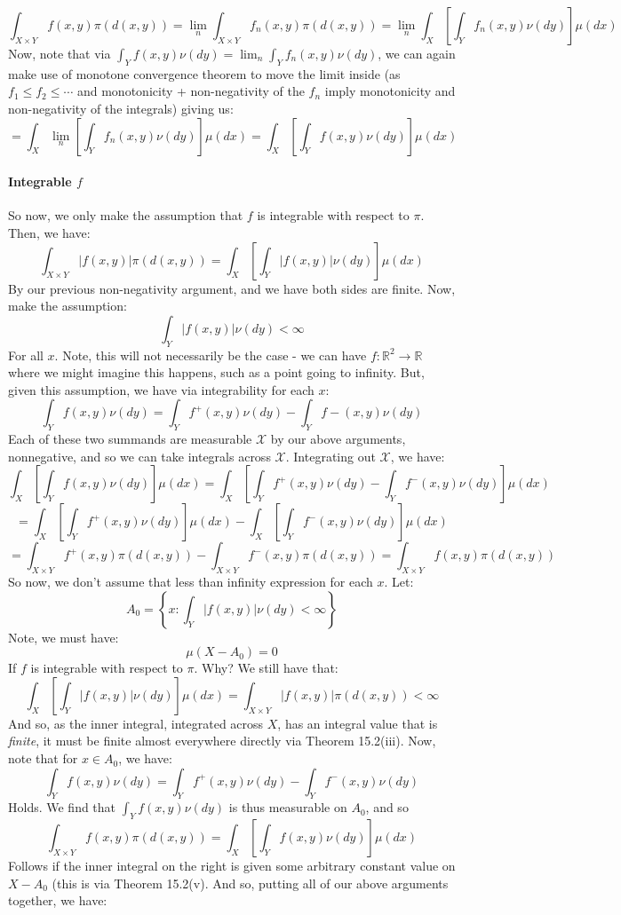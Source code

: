 \documentclass[12pt,a4paper]{article}
\newcommand{\1}[1]{\mathbbm{1}\left\{ #1 \right\}}
\newcommand{\R}{\mathbb{R}}
\newcommand{\xcal}{\mathcal{X}}
\begin{document}
$$
	\int_{X \times Y} f(x,y) \pi(d(x,y)) = 
	\lim_n \int_{X \times Y} f_n(x,y) \pi(d(x,y)) =
	\lim_n \int_X \left[\int_Y f_n(x,y) \nu(dy)\right] \mu(dx)
$$
Now, note that via $\int_Y f(x,y) \nu(dy) = \lim_n \int_Y f_n(x,y) \nu(dy)$, we can again make use of monotone convergence theorem to move the limit inside (as $f_1 \leq f_2 \leq \cdots$ and monotonicity + non-negativity of the $f_n$ imply monotonicity and non-negativity of the integrals) giving us:
$$
	= \int_X \lim_n \left[\int_Y f_n(x,y) \nu(dy)\right] \mu(dx) =
	\int_X \left[\int_Y f(x,y) \nu(dy)\right] \mu(dx)
$$

\paragraph{Integrable $f$} So now, we only make the assumption that $f$ is integrable with respect to $\pi$. Then, we have:
$$
	\int_{X \times Y} |f(x,y)| \pi(d(x,y)) = \int_X \left[\int_Y |f(x,y)| \nu(dy)\right] \mu(dx)
$$
By our previous non-negativity argument, and we have both sides are finite. Now, make the assumption:
$$
	\int_Y |f(x,y)| \nu(dy) < \infty
$$
For all $x$. Note, this will not necessarily be the case - we can have $f: \R^2 \to \R$ where we might imagine this happens, such as a point going to infinity. But, given this assumption, we have via integrability for each $x$:
$$
	\int_Y f(x,y) \nu(dy) =
	\int_Y f^+(x,y) \nu(dy) - \int_Y f-(x,y) \nu(dy)
$$
Each of these two summands are measurable $\xcal$ by our above arguments, nonnegative, and so we can take integrals across $\xcal$. Integrating out $\xcal$, we have:
$$
	\int_X \left[\int_Y f(x,y) \nu(dy)\right] \mu(dx) =
	\int_X \left[\int_Y f^+(x,y) \nu(dy) - \int_Y f^-(x,y) \nu(dy)\right] \mu(dx)
$$
$$
	= \int_X \left[\int_Y f^+(x,y) \nu(dy)\right] \mu(dx) -
	\int_X \left[\int_Y f^-(x,y) \nu(dy)\right] \mu(dx)
$$
$$
	= \int_{X \times Y} f^+(x,y) \pi(d(x,y)) - \int_{X \times Y} f^-(x,y) \pi(d(x,y)) =
	\int_{X \times Y} f(x,y) \pi(d(x,y))
$$
So now, we don't assume that less than infinity expression for each $x$. Let:
$$
	A_0 = \left\{x : \int_Y |f(x,y)| \nu(dy) < \infty\right\}
$$
Note, we must have:
$$
	\mu(X - A_0) = 0
$$
If $f$ is integrable with respect to $\pi$. Why? We still have that:
$$
	\int_X \left[\int_Y |f(x,y)| \nu(dy)\right] \mu(dx) = \int_{X \times Y} |f(x,y)| \pi(d(x,y)) < \infty
$$
And so, as the inner integral, integrated across $X$, has an integral value that is \textit{finite}, it must be finite almost everywhere directly via Theorem 15.2(iii). Now, note that for $x \in A_0$, we have:
$$
	\int_Y f(x,y) \nu(dy) =
	\int_Y f^+(x,y) \nu(dy) - \int_Y f^-(x,y) \nu(dy)
$$
Holds. We find that $\int_Y f(x,y) \nu(dy)$ is thus measurable on $A_0$, and so 
$$
	\int_{X \times Y} f(x,y) \pi(d(x,y)) = \int_X \left[\int_Y f(x,y) \nu(dy)\right] \mu(dx)
$$
Follows if the inner integral on the right is given some arbitrary constant value on $X - A_0$ (this is via Theorem 15.2(v). And so, putting all of our above arguments together, we have:
\end{document}
